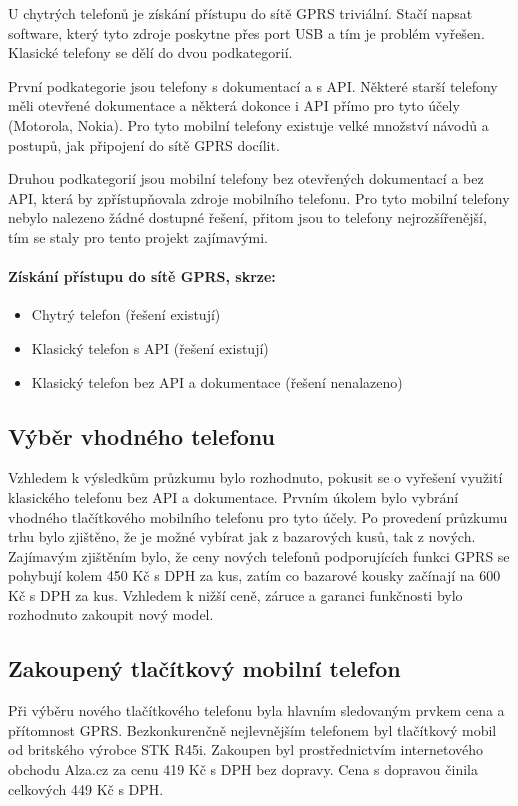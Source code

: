\documentclass[FM,DP]{tulthesis}  %
\begin{document}
U chytrých telefonů je získání přístupu do sítě GPRS triviální. Stačí napsat software, který tyto zdroje poskytne přes port USB a tím je problém vyřešen. Klasické telefony se dělí do dvou podkategorií. 

První podkategorie jsou telefony s dokumentací a s API. Některé starší telefony měli otevřené dokumentace a některá dokonce i API přímo pro tyto účely (Motorola, Nokia). Pro tyto mobilní telefony existuje velké množství návodů a postupů, jak připojení do sítě GPRS docílit. 

Druhou podkategorií jsou mobilní telefony bez otevřených dokumentací a bez API, která by zpřístupňovala zdroje mobilního telefonu. Pro tyto mobilní telefony nebylo nalezeno žádné dostupné řešení, přitom jsou to telefony nejrozšířenější, tím se staly pro tento projekt zajímavými.

\paragraph{Získání přístupu do sítě GPRS, skrze:}
\begin{itemize}
\item Chytrý telefon (řešení existují)
\item Klasický telefon s API (řešení existují)
\item Klasický telefon bez API a dokumentace (řešení nenalazeno)
\end{itemize} 

\subsection{Výběr vhodného telefonu}
Vzhledem k výsledkům průzkumu bylo rozhodnuto, pokusit se o vyřešení využití klasického telefonu bez API a dokumentace. Prvním úkolem bylo vybrání vhodného tlačítkového mobilního telefonu pro tyto účely. Po provedení průzkumu trhu bylo zjištěno, že je možné vybírat jak z bazarových kusů, tak z nových. Zajímavým zjištěním bylo, že ceny nových telefonů podporujících funkci GPRS se pohybují kolem 450 Kč s DPH za kus, zatím co bazarové kousky začínají na 600 Kč s DPH za kus. Vzhledem k nižší ceně, záruce a garanci funkčnosti bylo rozhodnuto zakoupit nový model.

\subsection{Zakoupený tlačítkový mobilní telefon}
Při výběru nového tlačítkového telefonu byla hlavním sledovaným prvkem cena a přítomnost GPRS. Bezkonkurenčně nejlevnějším telefonem byl tlačítkový mobil od britského výrobce STK R45i. Zakoupen byl prostřednictvím internetového obchodu Alza.cz za cenu 419 Kč s DPH bez dopravy. Cena s dopravou činila celkových 449 Kč s DPH.
\end{document}

